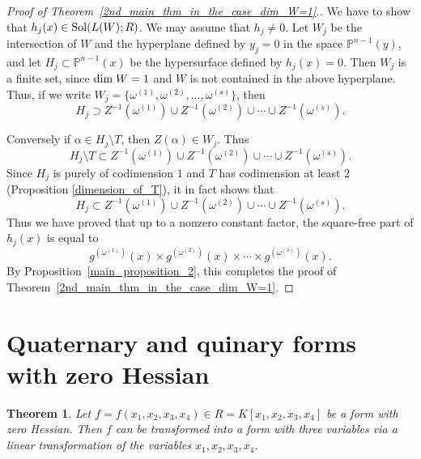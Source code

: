 \documentclass[12pt]{article}
\newtheorem{theorem}{Theorem}[section]
\theoremstyle{definition}
\theoremstyle{remark}
\def\dim{{\rm dim}}
\def\sol{{\rm Sol}}
\def\al{\alpha}
\def\om{\omega}
\newcommand {\PP}{\mathbb{P}}
\begin{document}
\begin{proof}[Proof of Theorem~\ref{2nd_main_thm_in_the_case_dim_W=1}.]
We have to show that $h_j(x) \in \sol(L(W); R)$.  
We may assume that $h_j \neq 0$. 
Let $W_j$ be the intersection of $W$ and the hyperplane defined by $y_j=0$ in the space $\PP ^{n-1}(y)$, 
and let  $H_j \subset \PP ^{n-1}(x)$ be the hypersurface defined by $h_j(x)=0$.  
Then $W_j$ is a finite set, since $\dim \; W=1$ and $W$ is not contained in the 
above hyperplane.
Thus,  if we write   
$W_j=\{\omega ^{(1)}, \omega ^{(2)}, \ldots, \omega ^{(s)} \}$, then   
\[H_j \supset Z^{-1}(\om ^{(1)}) \cup Z^{-1}(\om ^{(2)}) \cup \cdots \cup Z^{-1}(\om ^{(s)}).\]

Conversely if $\al \in H_j \setminus T$, then $Z(\al) \in W_j$. 
Thus 
\[H_j \setminus T \subset Z^{-1}(\omega ^{(1)}) \cup Z^{-1}(\omega ^{(2)}) \cup \cdots \cup Z^{-1}(\omega ^{(s)}).  \] 
Since $H_j$ is purely of codimension $1$ and $T$ has codimension 
at least 2 (Proposition \ref{dimension_of_T}), it in fact shows that  
\[H_j  \subset  Z^{-1}(\omega ^{(1)}) \cup Z^{-1}(\omega ^{(2)}) \cup \cdots \cup Z^{-1}(\omega ^{(s)}).  \] 
Thus we have proved that up to a nonzero constant factor, the square-free part of 
$h_j(x)$ is equal to
\[
g^{(\omega ^{(1)})}(x) \times g^{(\omega ^{(2)} )}(x) \times \cdots \times g^{(\omega ^{(s)})}(x).\] 
By Proposition~\ref{main_proposition_2}, this completes the proof of Theorem~\ref{2nd_main_thm_in_the_case_dim_W=1}.  
\end{proof}

\section{Quaternary and quinary forms with zero Hessian }  

\begin{theorem}  \label{quaternary_form_with_zero_hessian}   %
Let $f=f(x_1, x_2, x_3, x_4) \in R =  K[x_1, x_2, x_3, x_4]$ be  a form with zero Hessian. 
Then $f$ can be transformed into a form with three variables via a linear transformation of the variables $x_1, x_2, x_3, x_4$. 
\end{theorem}
\end{document}
